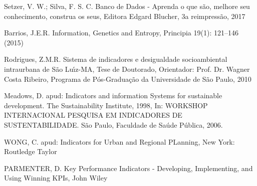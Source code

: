\documentclass[
12pt,		%
openright,	%
twoside,  %
a4paper,			%
chapter=TITLE,		%
english,			%
french,				%
spanish,			%
brazil				%
]{USPSC-classe/USPSC}
\begin{document}
\begin{flushleft}
\begin{flushleft}
 Setzer, V. W.; Silva, F. S. C. Banco de Dados - Aprenda o que s\~ao, melhore seu conhecimento, construa os seus, Editora Edgard Blucher, 3a reimpress\~ao, 2017
\end{flushleft}


\end{flushleft}


\begin{flushleft}
\begin{flushleft}
[Barrios, 2015] Barrios, J.E.R. Information, Genetics and Entropy, Principia 19(1): 121–146 (2015)
\end{flushleft}


\end{flushleft}


\begin{flushleft}
\begin{flushleft}
[Rodrigues, 2010] Rodrigues, Z.M.R. Sistema de indicadores e desigualdade socioambiental intraurbana de S\~ao Lu\'{\i}z-MA, Tese de Doutorado, Orientador: Prof. Dr. Wagner Costa Ribeiro, Programa de P\'os-Gradua\c{c}\~ao da Universidade de S\~ao Paulo, 2010
\end{flushleft}


\end{flushleft}


\begin{flushleft}
\begin{flushleft}
[MEADOWS, 2006] Meadows, D. apud: Indicators and information Systems for sustainable development. The Sustainability Institute, 1998, In: WORKSHOP INTERNACIONAL PESQUISA EM INDICADORES DE SUSTENTABILIDADE. S\~ao Paulo, Faculdade de Sa\'ude P\'ublica, 2006.
\end{flushleft}


\end{flushleft}


\begin{flushleft}
\begin{flushleft}
[WONG, 2006] WONG, C. apud: Indicators for Urban and Regional PLanning, New York: Routledge Taylor 
\end{flushleft}


\end{flushleft}


\begin{flushleft}
\begin{flushleft}
[PARMENTER, 2007] PARMENTER, D. Key Performance Indicators - Developing, Implementing, and Using Winning KPIs, John Wiley 
\end{flushleft}


\end{flushleft}
\end{document}
